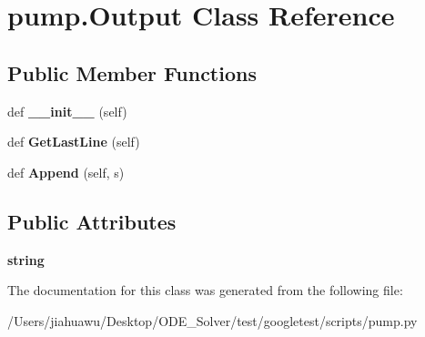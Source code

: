 \hypertarget{classpump_1_1_output}{}\section{pump.\+Output Class Reference}
\label{classpump_1_1_output}
\subsection*{Public Member Functions}
\begin{DoxyCompactItemize}
\item 
\mbox{\label{classpump_1_1_output_a01a703055e40078561bd4a5011de4a6d}} 
def {\bfseries \+\_\+\+\_\+init\+\_\+\+\_\+} (self)
\item 
\mbox{\label{classpump_1_1_output_a6ece94d24be171bae2a2234c052b4c58}} 
def {\bfseries Get\+Last\+Line} (self)
\item 
\mbox{\label{classpump_1_1_output_a6f284bb3f80e03594bc28286c695f5a7}} 
def {\bfseries Append} (self, s)
\end{DoxyCompactItemize}
\subsection*{Public Attributes}
\begin{DoxyCompactItemize}
\item 
\mbox{\label{classpump_1_1_output_a8786848ab3d235189379c449a446f883}} 
{\bfseries string}
\end{DoxyCompactItemize}


The documentation for this class was generated from the following file\+:\begin{DoxyCompactItemize}
\item 
/\+Users/jiahuawu/\+Desktop/\+O\+D\+E\+\_\+\+Solver/test/googletest/scripts/pump.\+py\end{DoxyCompactItemize}
